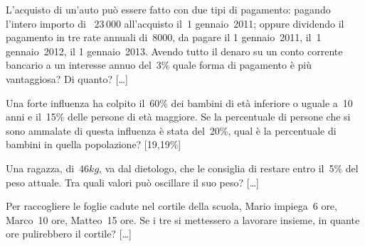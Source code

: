 \begin{multicols}{2}
\begin{esercizio}
\label{ese:3.212}
L'acquisto di un'auto può essere fatto con due tipi di pagamento: pagando
l'intero importo di \officialeuro\ 23\,000 all'acquisto il~1{\textdegree} 
gennaio~2011; oppure
dividendo il pagamento in tre rate annuali di~8000, da pagare il
1{\textdegree} gennaio~2011, il~1{\textdegree} gennaio~2012, il
1{\textdegree} gennaio~2013. Avendo tutto il denaro su un conto
corrente bancario a un interesse annuo del~3\% quale forma di pagamento
è più vantaggiosa? Di quanto? \hfill [\dots]
\end{esercizio}

\begin{esercizio}
\label{ese:3.213}
Una forte influenza ha colpito il~60\% dei bambini di età
inferiore o uguale a~10 anni e il~15\% delle persone di età maggiore.
Se la percentuale di persone che si sono ammalate di questa influenza
è stata del~20\%, qual è la percentuale di bambini in quella
popolazione? \hfill [19,19\%]
\end{esercizio}


\begin{esercizio}
\label{ese:3.215}
 Una ragazza, di~\(46\unit{kg}\), va dal dietologo, che
le consiglia di restare entro il~5\% del peso attuale. Tra
quali valori può oscillare il suo peso? \hfill [\dots]
\end{esercizio}

\begin{esercizio}
\label{ese:3.216}
Per raccogliere le foglie cadute nel cortile
della scuola, Mario impiega~6 ore, Marco~10 ore,
Matteo~15 ore. Se i tre si mettessero a lavorare
insieme, in quante ore pulirebbero il cortile? \hfill [\dots]
\end{esercizio}
% 
\end{multicols}
